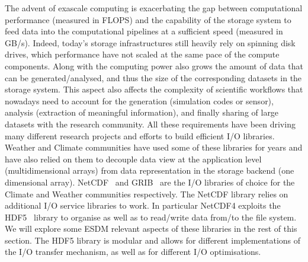 \documentclass{../../template/esiwace-report}
\begin{document}
The advent of exascale computing is exacerbating the gap between computational performance (measured in FLOPS) and the capability of the storage system to feed data into the computational pipelines at a sufficient speed (measured in GB/s). Indeed, today's storage infrastructures still heavily rely on spinning disk drives, which performance have not scaled at the same pace of the compute components. Along with the computing power also grows the amount of data that can be generated/analysed, and thus the size of the corresponding datasets in the storage system. This aspect also affects the complexity of scientific workflows that nowadays need to account for the generation (simulation codes or sensor), analysis (extraction of meaningful information), and finally sharing of large datasets with the research community. All these requirements have been driving many different research projects and efforts to build efficient I/O libraries. Weather and Climate communities have used some of these libraries for years and have also relied on them to decouple data view at the application level (multidimensional arrays) from data representation in the storage backend (one dimensional array). NetCDF~\cite{netcdf} and GRIB~\cite{grib} are the I/O libraries of choice for the Climate and Weather communities respectively. The NetCDF library relies on additional I/O service libraries to work. In particular NetCDF4 exploits the HDF5~\cite{hdf5} library to organise as well as to read/write data from/to the file system. We will explore some ESDM relevant aspects of these libraries in the rest of this section. The HDF5 library is modular and allows for different implementations of the I/O transfer mechanism, as well as for different I/O optimisations. 
\end{document}
